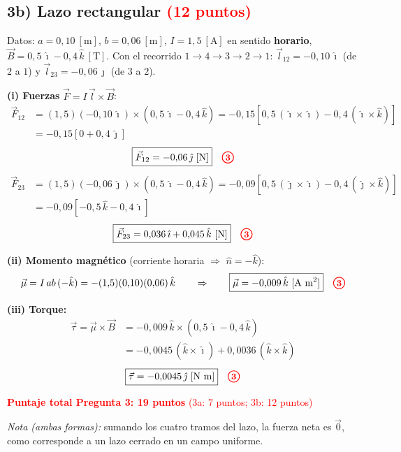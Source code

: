 \documentclass[12pt,letterpaper]{article}
\newcommand{\pts}[1]{\tikz[baseline=(c.base)]\node[circle,draw=red,text=red,thick,inner sep=1.3pt,font=\small\bfseries](c){#1};}
\begin{document}
\subsection*{3b) Lazo rectangular \quad\textcolor{red}{(12 puntos)}}

Datos: $a = 0{,}10\ [\text{m}]$, $b = 0{,}06\ [\text{m}]$, $I = 1{,}5\ [\text{A}]$ en sentido
\textbf{horario}, $\vec{B} = 0{,}5\,\hat{\imath} - 0{,}4\,\hat{k}\ [\text{T}]$.
Con el recorrido $1\to4\to3\to2\to1$: $\vec{l}_{12} = -0{,}10\,\hat{\imath}$ (de $2$ a $1$) y
$\vec{l}_{23} = -0{,}06\,\hat{\jmath}$ (de $3$ a $2$).

\textbf{(i) Fuerzas} $\vec{F} = I\,\vec{l}\times\vec{B}$:
\begin{align*}
    \vec{F}_{12} &= (1{,}5)(-0{,}10\,\hat{\imath})\times(0{,}5\,\hat{\imath} - 0{,}4\,\hat{k})
                  = -0{,}15\left[0{,}5\,(\hat{\imath}\times\hat{\imath}) - 0{,}4\,(\hat{\imath}\times\hat{k})\right]\\
                 &= -0{,}15\left[0 + 0{,}4\,\hat{\jmath}\right]
\end{align*}
\[
    \boxed{\vec{F}_{12} = -0{,}06\,\hat{\jmath}\ [\text{N}]} \quad\pts{3}
\]
\begin{align*}
    \vec{F}_{23} &= (1{,}5)(-0{,}06\,\hat{\jmath})\times(0{,}5\,\hat{\imath} - 0{,}4\,\hat{k})
                  = -0{,}09\left[0{,}5\,(\hat{\jmath}\times\hat{\imath}) - 0{,}4\,(\hat{\jmath}\times\hat{k})\right]\\
                 &= -0{,}09\left[-0{,}5\,\hat{k} - 0{,}4\,\hat{\imath}\right]
\end{align*}
\[
    \boxed{\vec{F}_{23} = 0{,}036\,\hat{\imath} + 0{,}045\,\hat{k}\ [\text{N}]} \quad\pts{3}
\]

\textbf{(ii) Momento magn\'etico} (corriente horaria $\Rightarrow$ $\hat{n} = -\hat{k}$):
\[
    \vec{\mu} = I\,ab\,(-\hat{k}) = -(1{,}5)(0{,}10)(0{,}06)\,\hat{k}
    \qquad\Rightarrow\qquad
    \boxed{\vec{\mu} = -0{,}009\,\hat{k}\ [\text{A m}^2]} \quad\pts{3}
\]

\textbf{(iii) Torque:}
\begin{align*}
    \vec{\tau} = \vec{\mu}\times\vec{B} &= -0{,}009\,\hat{k}\times(0{,}5\,\hat{\imath} - 0{,}4\,\hat{k})\\
               &= -0{,}0045\,(\hat{k}\times\hat{\imath}) + 0{,}0036\,(\hat{k}\times\hat{k})
\end{align*}
\[
    \boxed{\vec{\tau} = -0{,}0045\,\hat{\jmath}\ [\text{N m}]} \quad\pts{3}
\]


\medskip
\noindent\textcolor{red}{\textbf{Puntaje total Pregunta 3: 19 puntos}} \textcolor{red}{(3a: 7 puntos; 3b: 12 puntos)}

\medskip
\textit{Nota (ambas formas):} sumando los cuatro tramos del lazo, la fuerza neta es
$\vec{0}$, como corresponde a un lazo cerrado en un campo uniforme.
\end{document}
